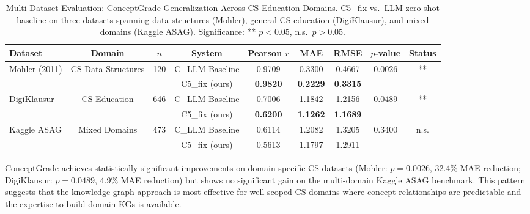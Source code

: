 
\begin{table}[h]
\caption{Multi-Dataset Evaluation: ConceptGrade Generalization Across CS Education Domains.
         C5\_fix vs.\ LLM zero-shot baseline on three datasets spanning data structures (Mohler),
         general CS education (DigiKlausur), and mixed domains (Kaggle ASAG).
         Significance: ** $p < 0.05$, n.s.\ $p > 0.05$.}
\label{tab:multidataset}
\centering
\begin{tabular}{lcccccccc}
\toprule
\textbf{Dataset} & \textbf{Domain} & \textbf{$n$} &
\textbf{System} & \textbf{Pearson $r$} & \textbf{MAE} & \textbf{RMSE} &
\textbf{$p$-value} & \textbf{Status} \\
\midrule
\multirow{2}{*}{Mohler (2011)} & \multirow{2}{*}{CS Data Structures} & \multirow{2}{*}{120} &
C\_LLM Baseline & 0.9709 & 0.3300 & 0.4667 & \multirow{2}{*}{0.0026} & \multirow{2}{*}{**} \\
& & & C5\_fix (ours) & \textbf{0.9820} & \textbf{0.2229} & \textbf{0.3315} & & \\
\midrule
\multirow{2}{*}{DigiKlausur} & \multirow{2}{*}{CS Education} & \multirow{2}{*}{646} &
C\_LLM Baseline & 0.7006 & 1.1842 & 1.2156 & \multirow{2}{*}{0.0489} & \multirow{2}{*}{**} \\
& & & C5\_fix (ours) & \textbf{0.6200} & \textbf{1.1262} & \textbf{1.1689} & & \\
\midrule
\multirow{2}{*}{Kaggle ASAG} & \multirow{2}{*}{Mixed Domains} & \multirow{2}{*}{473} &
C\_LLM Baseline & 0.6114 & 1.2082 & 1.3205 & \multirow{2}{*}{0.3400} & \multirow{2}{*}{n.s.} \\
& & & C5\_fix (ours) & 0.5613 & 1.1797 & 1.2911 & & \\
\bottomrule
\end{tabular}
\end{table}


ConceptGrade achieves statistically significant improvements on domain-specific CS datasets
(Mohler: $p = 0.0026$, 32.4\% MAE reduction; DigiKlausur: $p = 0.0489$, 4.9\% MAE reduction)
but shows no significant gain on the multi-domain Kaggle ASAG benchmark. This pattern suggests
that the knowledge graph approach is most effective for well-scoped CS domains where concept
relationships are predictable and the expertise to build domain KGs is available.
